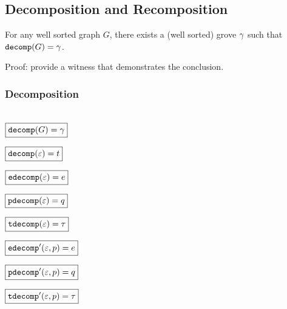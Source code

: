 
\subsection{Decomposition and Recomposition}

\begin{theorem}
  For any well sorted graph $G$,
  there exists a (well sorted) grove $\Grove$
  such that $\decomp{G} = \Grove$.
\end{theorem}

Proof: provide a witness that demonstrates the conclusion.



\figureDecompositionDefHelpersContent


\subsubsection{Decomposition}\hspace*{\fill} \\

\noindent $\boxed{\decomp{G} = \Grove}$
%
\figureDecompositionDefDecomp

\noindent $\boxed{\decomp{\e} = t}$
%
\figureDecompositionDefDecompTerm

\noindent $\boxed{\edecomp{\e} = e}$
%
\figureDecompositionDefEdecomp

\noindent $\boxed{\pdecomp{\e} = q}$
%
\figureDecompositionDefPdecomp

\noindent $\boxed{\tdecomp{\e} = \tau}$
%
\figureDecompositionDefTdecomp

\noindent $\boxed{\edecompPrime{\e}{p} = e}$
%
\figureDecompositionDefEdecompPrime

\noindent $\boxed{\pdecompPrime{\e}{p} = q}$
%
\figureDecompositionDefPdecompPrime

\noindent $\boxed{\tdecompPrime{\e}{p} = \tau}$
%
\figureDecompositionDefTdecompPrime%

